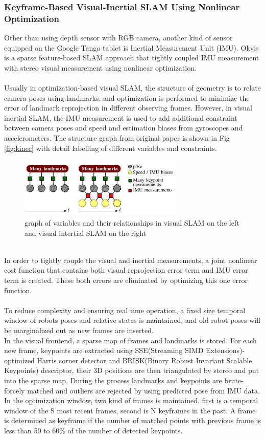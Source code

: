 \documentclass[12pt,twoside]{article}
\begin{document}
\subsubsection{Keyframe-Based Visual-Inertial SLAM Using Nonlinear Optimization}
Other than using depth sensor with RGB camera, another kind of sensor equipped on the Google Tango tablet is Inertial Measurement Unit (IMU). Okvis\cite{leutenegger2015keyframe} is a sparse feature-based SLAM approach that tightly coupled IMU measurement with stereo visual measurement using nonlinear optimization.\\
\\
Usually in optimization-based visual SLAM, the structure of geometry is to relate camera poses using landmarks, and optimization is performed to minimize the error of landmark reprojection in different observing frames. However, in visual inertial SLAM, the IMU measurement is used to add additional constraint between camera poses and speed and estimation biases from gyroscopes and accelerometers. The structure graph from original paper is shown in Fig \ref{fig:kinec} with detail labelling of different variables and constraints.\\
\begin{figure}[h]
    \centering
    \includegraphics[width=0.7\textwidth]{figures/okvis}
    \caption{graph of variables and their relationships in visual SLAM on the left and visual intertial SLAM on the right \cite{leutenegger2015keyframe}}
    \label{fig:okvis}
\end{figure}\\
In order to tightly couple the visual and inertial measurements, a joint nonlinear cost function that contains both visual reprojection error term and IMU error term is created. These both errors are eliminated by optimizing this one error function.\\
\\
To reduce complexity and ensuring real time operation, a fixed size temporal window of robots poses and relative states is maintained, and old robot poses will be marginalized out as new frames are inserted.\\
In the visual frontend, a sparse map of frames and landmarks is stored. For each new frame, keypoints are extracted using SSE(Streaming SIMD Extensions)-optimized Harris corner detector and BRISK(Binary Robust Invariant Scalable Keypoints) descriptor, their 3D positions are then triangulated by stereo and put into the sparse map. During the process landmarks and keypoints are brute-forcely matched and outliers are rejected by using predicted pose from IMU data. In the optimization window, two kind of frames is maintained, first is a temporal window of the S most recent frames, second is N keyframes in the past. A frame is determined as keyframe if the number of matched points with previous frame is less than 50 to 60\%  of the number of detected keypoints.\\
\end{document}

